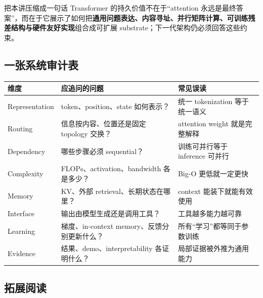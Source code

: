 \documentclass[a4paper]{article}
\begin{document}
\begin{importantbox}{把本讲压缩成一句话}
Transformer 的持久价值不在于“attention 永远是最终答案”，而在于它展示了如何把\textbf{通用问题表达、内容寻址、并行矩阵计算、可训练残差结构与硬件友好实现}组合成可扩展 substrate；下一代架构仍必须回答这些约束。
\end{importantbox}

\subsection{一张系统审计表}

\begin{longtable}{@{}L{0.18\textwidth}L{0.35\textwidth}L{0.35\textwidth}@{}}
\toprule
维度 & 应追问的问题 & 常见误读 \\
\midrule
Representation & token、position、state 如何表示？ & 统一 tokenization 等于统一语义 \\
Routing & 信息按内容、位置还是固定 topology 交换？ & attention weight 就是完整解释 \\
Dependency & 哪些步骤必须 sequential？ & 训练可并行等于 inference 可并行 \\
Complexity & FLOPs、activation、bandwidth 各是多少？ & Big-O 更低就一定更快 \\
Memory & KV、外部 retrieval、长期状态在哪里？ & context 能装下就能有效使用 \\
Interface & 输出由模型生成还是调用工具？ & 工具越多能力越可靠 \\
Learning & 梯度、in-context memory、反馈分别更新什么？ & 所有“学习”都等同于参数训练 \\
Evidence & 结果、demo、interpretability 各证明什么？ & 局部证据被外推为通用能力 \\
\bottomrule
\end{longtable}

\subsection{拓展阅读}
\end{document}
